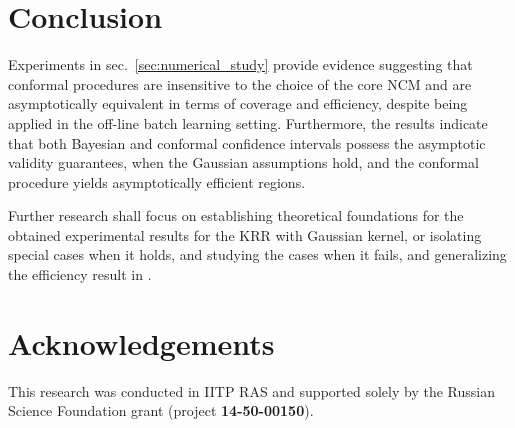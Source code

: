 \documentclass[conference]{IEEEtran}
\begin{document}

\section{Conclusion} %
\label{sec:conclusion}

Experiments in sec.~\ref{sec:numerical_study} provide evidence suggesting that
conformal procedures are insensitive to the choice of the core NCM and are asymptotically
equivalent in terms of coverage and efficiency, despite being applied in the off-line
batch learning setting. Furthermore, the results indicate that both Bayesian and
conformal confidence intervals possess the asymptotic validity guarantees, when
the Gaussian assumptions hold, and the conformal procedure yields asymptotically
efficient regions.

Further research shall focus on establishing theoretical foundations for the obtained
experimental results for the KRR with Gaussian kernel, or isolating special cases
when it holds, and studying the cases when it fails, and generalizing the efficiency
result in \cite{burnaevV14}.


\section*{Acknowledgements} %
\label{sec:acknowledgements}
\noindent This research was conducted in IITP RAS and supported solely by the
Russian Science Foundation grant (project \textbf{14-50-00150}).




\end{document}
